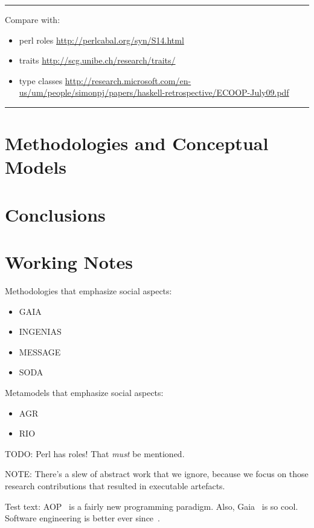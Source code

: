 \documentclass{article}
\newenvironment{notes}{\medskip\hrule\smallskip\narrower}{\smallskip\hrule\medskip}
\begin{document}
\begin{notes}
Compare with:
\begin{itemize}
\item perl roles \url{http://perlcabal.org/syn/S14.html}
\item traits \url{http://scg.unibe.ch/research/traits/}
\item type classes \url{http://research.microsoft.com/en-us/um/people/simonpj/papers/haskell-retrospective/ECOOP-July09.pdf}
\end{itemize}
\end{notes}

\section{Methodologies and Conceptual Models}\label{sec:general_nonsense} %

\section{Conclusions}\label{sec:conclusions} %

\section{Working Notes} %
Methodologies that emphasize social aspects:
\begin{itemize}
\item GAIA~\cite{journals/aamas/WooldridgeJK00}
\item INGENIAS
\item MESSAGE
\item SODA
\end{itemize}
Metamodels that emphasize social aspects:
\begin{itemize}
\item AGR~\cite{conf/aose/FerberGM03}
\item RIO
\end{itemize}

TODO: Perl has roles! That \emph{must} be mentioned.

NOTE: There's a slew of abstract work that we ignore, because we focus on those research contributions that resulted in executable artefacts.

Test text:
AOP~\cite{journals/ai/Shoham93} is a fairly new programming paradigm.
Also, Gaia~\cite{journals/aamas/WooldridgeJK00} is so cool.
Software engineering is better ever since~\cite{conf/aose/WooldridgeC00}.



\end{document}
